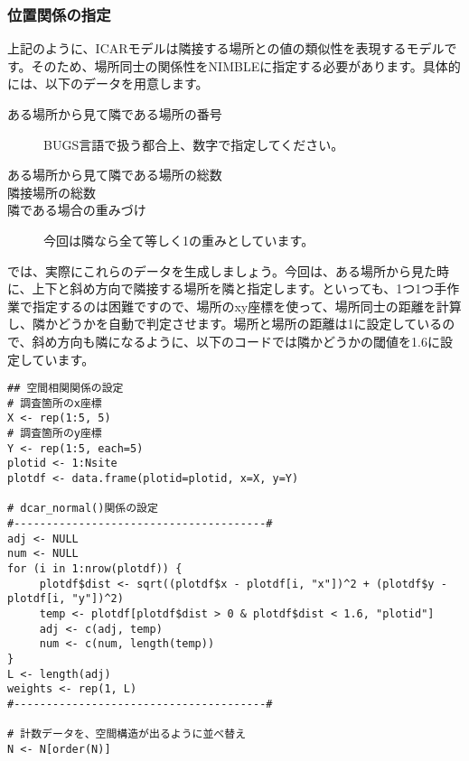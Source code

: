 		\subsubsection{位置関係の指定}
上記のように、ICARモデルは隣接する場所との値の類似性を表現するモデルです。そのため、場所同士の関係性をNIMBLEに指定する必要があります。具体的には、以下のデータを用意します。
\begin{description}
  \item[ある場所から見て隣である場所の番号]BUGS言語で扱う都合上、数字で指定してください。
  \item[ある場所から見て隣である場所の総数]
  \item[隣接場所の総数]
  \item[隣である場合の重みづけ]今回は隣なら全て等しく1の重みとしています。
\end{description}
では、実際にこれらのデータを生成しましょう。今回は、ある場所から見た時に、上下と斜め方向で隣接する場所を隣と指定します。といっても、1つ1つ手作業で指定するのは困難ですので、場所のxy座標を使って、場所同士の距離を計算し、隣かどうかを自動で判定させます。場所と場所の距離は1に設定しているので、斜め方向も隣になるように、以下のコードでは隣かどうかの閾値を1.6に設定しています。
\begin{verbatim}
## 空間相関関係の設定
# 調査箇所のx座標
X <- rep(1:5, 5)
# 調査箇所のy座標
Y <- rep(1:5, each=5)
plotid <- 1:Nsite
plotdf <- data.frame(plotid=plotid, x=X, y=Y)

# dcar_normal()関係の設定
#---------------------------------------#
adj <- NULL
num <- NULL
for (i in 1:nrow(plotdf)) {
     plotdf$dist <- sqrt((plotdf$x - plotdf[i, "x"])^2 + (plotdf$y - plotdf[i, "y"])^2)
     temp <- plotdf[plotdf$dist > 0 & plotdf$dist < 1.6, "plotid"]
     adj <- c(adj, temp)
     num <- c(num, length(temp))
}
L <- length(adj)
weights <- rep(1, L)
#---------------------------------------#

# 計数データを、空間構造が出るように並べ替え
N <- N[order(N)]
\end{verbatim}

